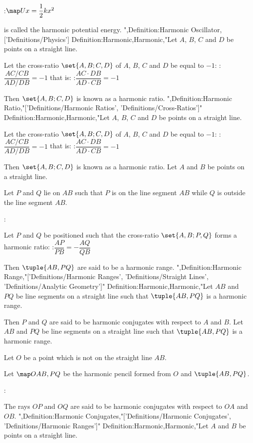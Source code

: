 :$\map U x = \dfrac 1 2 k x^2$

is called the harmonic potential energy.
",Definition:Harmonic Oscillator,['Definitions/Physics']
Definition:Harmonic,Harmonic,"Let $A$, $B$, $C$ and $D$ be points on a straight line.

Let the cross-ratio $\set {A, B; C, D}$ of $A$, $B$, $C$ and $D$ be equal to $-1$:
:$\dfrac {AC / CB} {AD / DB} = -1$
that is:
:$\dfrac {AC \cdot DB} {AD \cdot CB} = -1$


Then $\set {A, B; C, D}$ is known as a harmonic ratio.
",Definition:Harmonic Ratio,"['Definitions/Harmonic Ratios', 'Definitions/Cross-Ratios']"
Definition:Harmonic,Harmonic,"Let $A$, $B$, $C$ and $D$ be points on a straight line.

Let the cross-ratio $\set {A, B; C, D}$ of $A$, $B$, $C$ and $D$ be equal to $-1$:
:$\dfrac {AC / CB} {AD / DB} = -1$
that is:
:$\dfrac {AC \cdot DB} {AD \cdot CB} = -1$


Then $\set {A, B; C, D}$ is known as a harmonic ratio.
Let $A$ and $B$ be points on a straight line.

Let $P$ and $Q$ lie on $AB$ such that $P$ is on the line segment $AB$ while $Q$ is outside the line segment $AB$.


:


Let $P$ and $Q$ be positioned such that the cross-ratio $\set {A, B; P, Q}$ forms a harmonic ratio:
:$\dfrac {AP} {PB} = -\dfrac {AQ} {QB}$


Then $\tuple {AB, PQ}$ are said to be a harmonic range.
",Definition:Harmonic Range,"['Definitions/Harmonic Ranges', 'Definitions/Straight Lines', 'Definitions/Analytic Geometry']"
Definition:Harmonic,Harmonic,"Let $AB$ and $PQ$ be line segments on a straight line such that $\tuple {AB, PQ}$ is a harmonic range.

Then $P$ and $Q$ are said to be harmonic conjugates with respect to $A$ and $B$.
Let $AB$ and $PQ$ be line segments on a straight line such that $\tuple {AB, PQ}$ is a harmonic range.

Let $O$ be a point which is not on the straight line $AB$.

Let $\map O {AB, PQ}$ be the harmonic pencil formed from $O$ and $\tuple {AB, PQ}$.


:


The rays $OP$ and $OQ$ are said to be harmonic conjugates with respect to $OA$ and $OB$.
",Definition:Harmonic Conjugates,"['Definitions/Harmonic Conjugates', 'Definitions/Harmonic Ranges']"
Definition:Harmonic,Harmonic,"Let $A$ and $B$ be points on a straight line.

